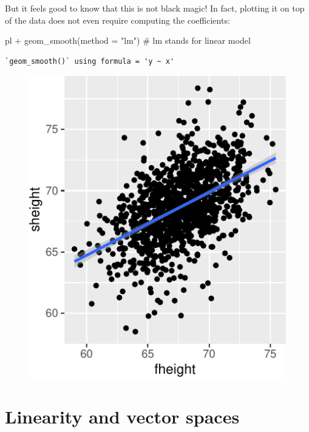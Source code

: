 \documentclass[
  letterpaper,
  DIV=11,
  numbers=noendperiod]{scrreprt}
\newenvironment{Shaded}{\begin{snugshade}}{\end{snugshade}}
\newcommand{\AttributeTok}[1]{\textcolor[rgb]{0.40,0.45,0.13}{#1}}
\newcommand{\CommentTok}[1]{\textcolor[rgb]{0.37,0.37,0.37}{#1}}
\newcommand{\FunctionTok}[1]{\textcolor[rgb]{0.28,0.35,0.67}{#1}}
\newcommand{\NormalTok}[1]{\textcolor[rgb]{0.00,0.23,0.31}{#1}}
\newcommand{\SpecialCharTok}[1]{\textcolor[rgb]{0.37,0.37,0.37}{#1}}
\newcommand{\StringTok}[1]{\textcolor[rgb]{0.13,0.47,0.30}{#1}}
\begin{document}
But it feels good to know that this is not black magic! In fact,
plotting it on top of the data does not even require computing the
coefficients:

\begin{Shaded}
\begin{Highlighting}[]
\NormalTok{pl }\SpecialCharTok{+} \FunctionTok{geom\_smooth}\NormalTok{(}\AttributeTok{method =} \StringTok{"lm"}\NormalTok{) }\CommentTok{\# lm stands for linear model}
\end{Highlighting}
\end{Shaded}

\begin{verbatim}
`geom_smooth()` using formula = 'y ~ x'
\end{verbatim}

\begin{figure}[H]

{\centering \includegraphics{./07-linalg_files/figure-pdf/unnamed-chunk-8-1.pdf}

}

\end{figure}

\hypertarget{linearity-and-vector-spaces}{%
\section{Linearity and vector
spaces}\label{linearity-and-vector-spaces}}
\end{document}
